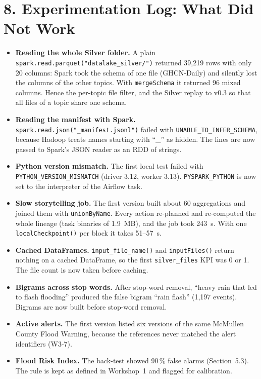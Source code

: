 \documentclass[stu, 12pt, letterpaper, donotrepeattitle, floatsintext, natbib]{apa7}
\begin{document}
\section{\large 8. Experimentation Log: What Did Not Work}
\begin{itemize}
    \item \textbf{Reading the whole Silver folder.} A plain \texttt{spark.read.parquet("datalake\_silver/")} returned 39,219 rows with only 20 columns: Spark took the schema of one file (GHCN-Daily) and silently lost the columns of the other topics. With \texttt{mergeSchema} it returned 96 mixed columns. Hence the per-topic file filter, and the Silver replay to v0.3 so that all files of a topic share one schema.
    \item \textbf{Reading the manifest with Spark.} \texttt{spark.read.json("\_manifest.jsonl")} failed with \texttt{UNABLE\_TO\_INFER\_SCHEMA}, because Hadoop treats names starting with ``\_'' as hidden. The lines are now passed to Spark's JSON reader as an RDD of strings.
    \item \textbf{Python version mismatch.} The first local test failed with \texttt{PYTHON\_VERSION\_MISMATCH} (driver 3.12, worker 3.13). \texttt{PYSPARK\_PYTHON} is now set to the interpreter of the Airflow task.
    \item \textbf{Slow storytelling job.} The first version built about 60 aggregations and joined them with \texttt{unionByName}. Every action re-planned and re-computed the whole lineage (task binaries of 1.9~MB), and the job took 243~s. With one \texttt{localCheckpoint()} per block it takes 51--57~s.
    \item \textbf{Cached DataFrames.} \texttt{input\_file\_name()} and \texttt{inputFiles()} return nothing on a cached DataFrame, so the first \texttt{silver\_files} KPI was 0 or 1. The file count is now taken before caching.
    \item \textbf{Bigrams across stop words.} After stop-word removal, ``heavy rain that led to flash flooding'' produced the false bigram ``rain flash'' (1,197 events). Bigrams are now built before stop-word removal.
    \item \textbf{Active alerts.} The first version listed six versions of the same McMullen County Flood Warning, because the references never matched the alert identifiers (W3-7).
    \item \textbf{Flood Risk Index.} The back-test showed 90\,\% false alarms (Section~5.3). The rule is kept as defined in Workshop~1 and flagged for calibration.
\end{itemize}
\end{document}
